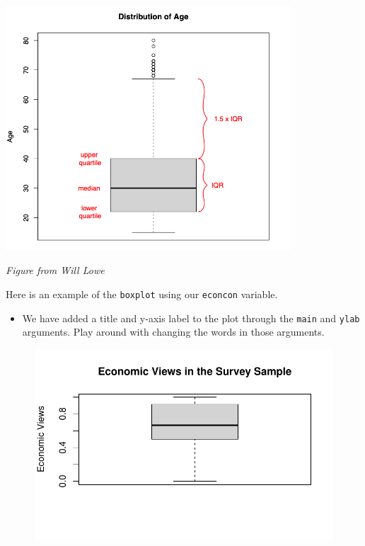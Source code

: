 \documentclass[
  letterpaper,
  DIV=11,
  numbers=noendperiod]{scrreprt}
\newenvironment{Shaded}{\begin{snugshade}}{\end{snugshade}}
\newcommand{\AttributeTok}[1]{\textcolor[rgb]{0.40,0.45,0.13}{#1}}
\newcommand{\FunctionTok}[1]{\textcolor[rgb]{0.28,0.35,0.67}{#1}}
\newcommand{\NormalTok}[1]{\textcolor[rgb]{0.00,0.23,0.31}{#1}}
\newcommand{\SpecialCharTok}[1]{\textcolor[rgb]{0.37,0.37,0.37}{#1}}
\newcommand{\StringTok}[1]{\textcolor[rgb]{0.13,0.47,0.30}{#1}}
\providecommand{\tightlist}{%
  \setlength{\itemsep}{0pt}\setlength{\parskip}{0pt}}\usepackage{longtable,booktabs,array}
\begin{document}
\includegraphics[width=0.8\textwidth,height=\textheight]{images/agebox.png}

\emph{Figure from Will Lowe}

Here is an example of the \texttt{boxplot} using our \texttt{econcon}
variable.

\begin{itemize}
\tightlist
\item
  We have added a title and y-axis label to the plot through the
  \texttt{main} and \texttt{ylab} arguments. Play around with changing
  the words in those arguments.
\end{itemize}

\begin{Shaded}
\end{Shaded}

\begin{figure}[H]

{\centering \includegraphics{04-Visualization_files/figure-pdf/unnamed-chunk-4-1.pdf}

}

\end{figure}
\end{document}
